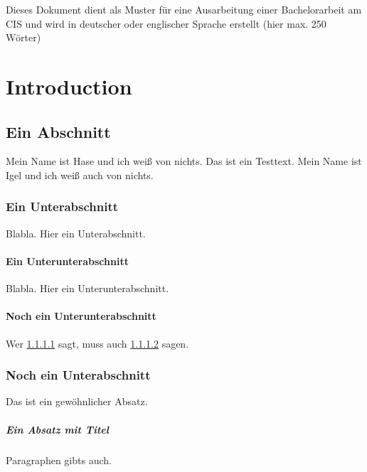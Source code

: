 \documentclass[11pt,a4paper,twoside,openright]{scrbook}
\begin{document}
\deckblatt

\pagestyle{scrheadings}

\erklaerung

\thispagestyle{scrplain}
\noindent
Dieses Dokument dient als Muster für eine Ausarbeitung einer
Bachelorarbeit am CIS und wird in deutscher oder englischer Sprache
erstellt (hier max. 250 Wörter)


\tableofcontents


\chapter{Introduction}
\cite{irbook}
\section{Ein Abschnitt}

Mein Name ist Hase und ich weiß von nichts. Das ist ein Testtext. Mein Name ist
Igel und ich weiß auch von nichts.

\subsection{Ein Unterabschnitt}
Blabla. Hier ein Unterabschnitt.

\subsubsection{Ein Unterunterabschnitt}
\label{sec:a}
Blabla. Hier ein Unterunterabschnitt.

\subsubsection{Noch ein Unterunterabschnitt}
\label{sec:b}

Wer \ref{sec:a} sagt, muss auch \ref{sec:b} sagen.

\subsection{Noch ein Unterabschnitt}

Das ist ein gewöhnlicher Absatz.

\paragraph{Ein Absatz mit Titel}
Paragraphen gibts auch.
\end{document}
